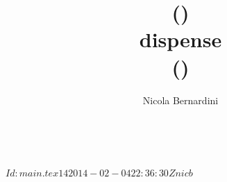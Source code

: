 \documentclass{scrbook}
\title{\topic (\topicacro) \level\\dispense\\{\tiny (\rcstag)}}
\author{Nicola Bernardini}
\date{~}
\begin{document}
\svnInfo $Id: main.tex 14 2014-02-04 22:36:30Z nicb $

\maketitle

\tableofcontents









\end{document}
